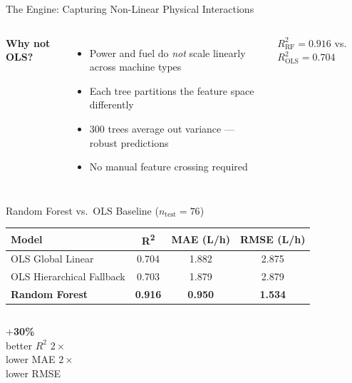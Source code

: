 \documentclass[aspectratio=169]{beamer}
\begin{document}
\begin{frame}{The Engine: Capturing Non-Linear Physical Interactions}
\begin{columns}[c]
      \textbf{Why not OLS?}
      \begin{itemize}\setlength\itemsep{0.5em}
        \item Power and fuel do \emph{not} scale linearly across machine types
        \item Each tree partitions the feature space differently
        \item 300 trees average out variance — robust predictions
        \item No manual feature crossing required
      \end{itemize}
      \vspace{0.7em}
      {\small$R^2_{\text{RF}} = 0.916$ \quad vs.\quad $R^2_{\text{OLS}} = 0.704$}
  \end{columns}
\end{frame}

\begin{frame}{Random Forest vs.\ OLS Baseline ($n_{\text{test}}=76$)}
  \centering
  \vspace{0.3em}
  \begin{tabular}{lccc}
    \toprule
    \textbf{Model}
      & \textbf{R\textsuperscript{2}}
      & \textbf{MAE (L/h)}
      & \textbf{RMSE (L/h)} \\
    \midrule
    OLS Global Linear         & 0.704 & 1.882 & 2.875 \\
    OLS Hierarchical Fallback & 0.703 & 1.879 & 2.879 \\
    \rowcolor{rfgreen!25}
    \textcolor{rfgreen}{\textbf{Random Forest}}
      & \textcolor{rfgreen}{\textbf{0.916}}
      & \textcolor{rfgreen}{\textbf{0.950}}
      & \textcolor{rfgreen}{\textbf{1.534}} \\
    \bottomrule
  \end{tabular}

  \vspace{1.0em}
  \begin{columns}[c]
    \centering
      {\color{rfgreen}\Huge\bfseries $+$30\%}\\[2pt]{\small better $R^2$}
    \centering
      {\color{rfgreen}\Huge\bfseries $2\times$}\\[2pt]{\small lower MAE}
    \centering
      {\color{rfgreen}\Huge\bfseries $2\times$}\\[2pt]{\small lower RMSE}
  \end{columns}
\end{frame}
\end{document}
